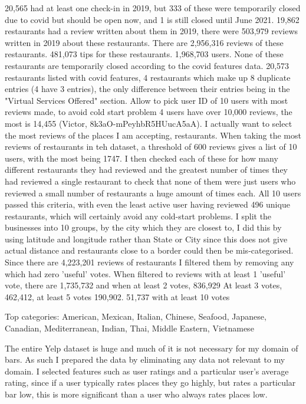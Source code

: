 \documentclass[conference]{IEEEtran}
\begin{document}
20,565 had at least one check-in in 2019, but 333 of these were temporarily closed due to covid but should be 
open now, and 1 is still closed until June 2021. 
19,862 restaurants had a review written about them in 2019, there were 503,979 reviews written in 2019 about these restaurants. 
There are 2,956,316 reviews of these restaurants. 
481,073 tips for these restaurants. 
1,968,703 users. 
None of these restaurants are temporarily closed according to the covid features data. 
20,573 restaurants listed with covid features, 4 restaurants which make up 8 duplicate entries 
(4 have 3 entries), the only difference between their entries being in the 
"Virtual Services Offered" section. 
Allow to pick user ID of 10 users with most reviews made, to avoid cold start problem
4 users have over 10,000 reviews, the most is 14,455 (Victor, 8k3aO-mPeyhbR5HUucA5aA). 
I actually want to select the most reviews of the places I am accepting, restaurants. 
When taking the most reviews of restaurants in teh dataset, a threshold of 600 reviews gives a list of 10 users, 
with the most being 1747. 
I then checked each of these for how many different restaurants they had reviewed and the greatest number of times 
they had reviewed a single restaurant to check that none of them were just users who reviewed a small number of 
restaurants a huge amount of times each. 
All 10 users passed this criteria, with even the least active user having reviewed 496 unique restaurants, which will 
certainly avoid any cold-start problems. 
I split the businesses into 10 groups, by the city which they are closest to, I did this by using latitude and 
longitude rather than State or City since this does not give actual distance and restaurants close to a border 
could then be mis-categorised. 
Since there are 4,223,201 reviews of restaurants I filtered them by removing any which had zero 'useful' votes. 
When filtered to reviews with at least 1 'useful' vote, there are 1,735,732 and when at least 2 votes, 836,929
At least 3 votes, 462,412, at least 5 votes 190,902. 
51,737 with at least 10 votes

Top categories: American, Mexican, Italian, Chinese, Seafood, Japanese, Canadian, Mediterranean, Indian, Thai, Middle Eastern, Vietnamese

The entire Yelp dataset is huge and much of it is not necessary for my domain of bars.
As such I prepared the data by eliminating any data not relevant to my domain.
I selected features such as user ratings and a particular user's average rating,
since if a user typically rates places they go highly, but rates a particular bar low,
this is more significant than a user who always rates places low.
\end{document}
